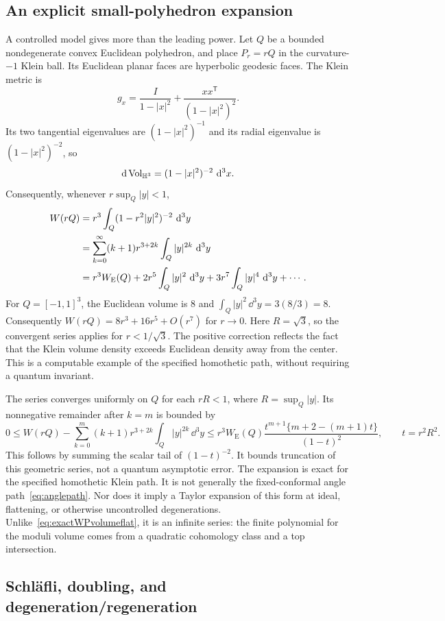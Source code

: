 \subsection{An explicit small-polyhedron expansion}

A controlled model gives more than the leading power. Let $Q$ be a
bounded nondegenerate convex Euclidean polyhedron, and place $P_r=rQ$ in
the curvature-$-1$ Klein ball. Its Euclidean planar faces are
hyperbolic geodesic faces. The Klein metric is
\[
 g_x=\frac{I}{1-|x|^2}
       +\frac{xx^{\mathsf T}}{(1-|x|^2)^2}.
\]
Its two tangential eigenvalues are $(1-|x|^2)^{-1}$ and its
radial eigenvalue is $(1-|x|^2)^{-2}$, so
\[
 \mathop{}\!\mathrm d\operatorname{Vol}_{\mathbb H^3}=(1-|x|^2)^{-2}\,\mathop{}\!\mathrm d^3x.
\]
Consequently, whenever $r\sup_Q|y|<1$,
\begin{align}
 W(rQ)
 &=r^3\int_Q(1-r^2|y|^2)^{-2}\,\mathop{}\!\mathrm d^3y\notag\\
 &=\sum_{k=0}^{\infty}(k+1)r^{3+2k}
                         \int_Q|y|^{2k}\,\mathop{}\!\mathrm d^3y\notag\\
 &=r^3 W_{\mathrm E}(Q)
      +2r^5\int_Q|y|^2\,\mathop{}\!\mathrm d^3y
      +3r^7\int_Q|y|^4\,\mathop{}\!\mathrm d^3y+\cdots.
 \label{eq:Kleinvolumeexpansion}
\end{align}
For $Q=[-1,1]^3$, the Euclidean volume is $8$ and
$\int_Q|y|^2\,\dd^3y=3(8/3)=8$. Consequently
$W(rQ)=8r^3+16r^5+O(r^7)$ for $r\to0$.
Here $R=\sqrt3$, so the convergent series applies for
$r<1/\sqrt3$. The positive correction reflects the fact that
the Klein volume density exceeds Euclidean density away from
the center. This is a computable example of the specified
homothetic path, without requiring a quantum invariant.

The series converges uniformly on $Q$ for each
$rR<1$, where $R=\sup_Q|y|$. Its nonnegative remainder after
$k=m$ is bounded by
\[
 0\le W(rQ)-\sum_{k=0}^m(k+1)r^{3+2k}
                 \int_Q|y|^{2k}\,\dd^3y
 \le r^3W_{\mathrm E}(Q)
 \frac{t^{m+1}\{m+2-(m+1)t\}}{(1-t)^2},\qquad t=r^2R^2.
\]
This follows by summing the scalar tail of $(1-t)^{-2}$.
It bounds truncation of this geometric series, not a quantum
asymptotic error. The expansion is exact for the specified
homothetic Klein path. It is not generally the fixed-conformal
angle path~\eqref{eq:anglepath}. Nor does it imply a Taylor expansion
of this form at ideal, flattening, or otherwise uncontrolled
degenerations. Unlike~\eqref{eq:exactWPvolumeflat}, it is an infinite
series: the finite polynomial for the moduli volume comes from a
quadratic cohomology class and a top intersection.

\subsection{Schl\"afli, doubling, and degeneration/regeneration}

